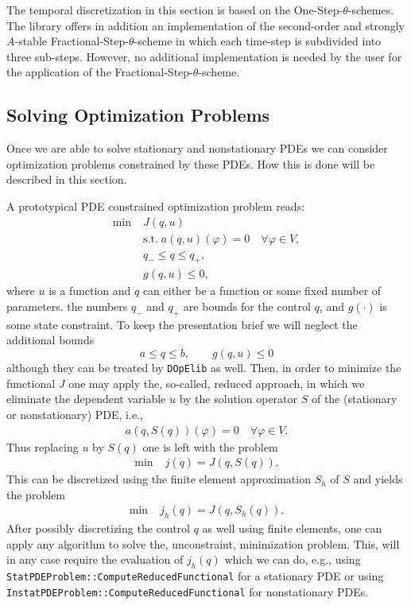 \documentclass[smallextended]{svjour3}       %
\numberwithin{equation}{section}
\renewcommand{\phi}{\varphi}
\newcommand{\dope}{\texttt{DOpElib}}
\begin{document}
\begin{remark}
The temporal discretization in this section 
is based on the One-Step-$\theta$-schemes. The library
offers in addition an implementation 
of the second-order and strongly $A$-stable 
Fractional-Step-$\theta$-scheme in which 
each time-step is subdivided into three 
sub-steps. However, no additional implementation is needed by the user 
for the application of the Fractional-Step-$\theta$-scheme.
\end{remark}

\subsection{Solving Optimization Problems}\label{sec:opt}
Once we are able to solve stationary and nonstationary PDEs
we can consider optimization problems constrained by these PDEs.
How this is done will be described in this section. 

A prototypical PDE constrained optimization problem reads:
\begin{align*}
\min\;&J(q,u) \\
  &\text{s.t.}\; a(q,u)(\phi) = 0 \quad \forall \phi\in V,\\
  &q_- \le q \le q_+,\\
  &g(q,u) \le 0,  
\end{align*}
where $u$ is a function and $q$ can either be a function or some 
fixed number of parameters. the numbers $q_-$ and $q_+$ are bounds for 
the control $q$, and $g(\cdot)$ is some state constraint.
To keep the presentation brief we will neglect the additional bounds
\[
a \le q \le b,\qquad g(q,u) \le 0
\]
although they can be treated by \dope{} as well.
Then, in order to minimize the functional $J$ one may apply the, so-called, 
reduced approach, in which we eliminate the dependent variable $u$ by the solution 
operator $S$ of the (stationary or nonstationary) PDE, i.e., 
\begin{align*}
a(q,S(q))(\phi) = 0 \quad \forall \phi\in V. 
\end{align*}
Thus replacing $u$ by $S(q)$ one is left with the problem
\begin{align*}
\min\;&j(q) = J(q,S(q)). 
\end{align*}
This can be discretized using the finite element approximation $S_h$ of $S$ 
and yields the problem 
\begin{align*}
\min\;&j_h(q) = J(q,S_h(q)). 
\end{align*}
After possibly discretizing the control $q$ as well using finite elements, 
one can apply any algorithm to solve the, unconstraint, minimization 
problem. This, will in any case require the evaluation of $j_h(q)$ which 
we can do, e.g., using \texttt{StatPDEProblem::ComputeReducedFunctional} for 
a stationary PDE or using \texttt{InstatPDEProblem::ComputeReducedFunctional} 
for nonstationary PDEs. 
\end{document}
